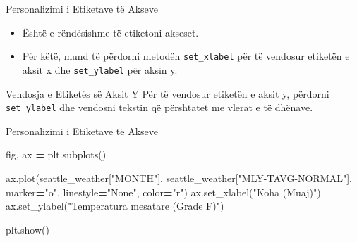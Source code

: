\documentclass[
  ignorenonframetext,
]{beamer}
\newenvironment{Shaded}{\begin{snugshade}}{\end{snugshade}}
\newcommand{\NormalTok}[1]{#1}
\newcommand{\OperatorTok}[1]{\textcolor[rgb]{0.81,0.36,0.00}{\textbf{#1}}}
\newcommand{\StringTok}[1]{\textcolor[rgb]{0.31,0.60,0.02}{#1}}
\begin{document}
\begin{frame}[fragile]{Personalizimi i Etiketave të Akseve}
\protect\hypertarget{personalizimi-i-etiketave-tuxeb-akseve}{}
\begin{itemize}
\item
  Është e rëndësishme të etiketoni akseset.
\item
  Për këtë, mund të përdorni metodën \texttt{set\_xlabel} për të
  vendosur etiketën e aksit x dhe \texttt{set\_ylabel} për aksin y.
\end{itemize}
\end{frame}

\begin{frame}[fragile]{Vendosja e Etiketës së Aksit Y}
\protect\hypertarget{vendosja-e-etiketuxebs-suxeb-aksit-y}{}
Për të vendosur etiketën e aksit y, përdorni \texttt{set\_ylabel} dhe
vendosni tekstin që përshtatet me vlerat e të dhënave.
\end{frame}

\begin{frame}[fragile]{Personalizimi i Etiketave të Akseve}
\protect\hypertarget{personalizimi-i-etiketave-tuxeb-akseve-1}{}

\begin{Shaded}
\begin{Highlighting}[]
\NormalTok{fig, ax }\OperatorTok{=}\NormalTok{ plt.subplots()}

\NormalTok{ax.plot(seattle\_weather[}\StringTok{"MONTH"}\NormalTok{], seattle\_weather[}\StringTok{"MLY{-}TAVG{-}NORMAL"}\NormalTok{],}
\NormalTok{marker}\OperatorTok{=}\StringTok{"o"}\NormalTok{, linestyle}\OperatorTok{=}\StringTok{"None"}\NormalTok{, color}\OperatorTok{=}\StringTok{"r"}\NormalTok{)}
\NormalTok{ax.set\_xlabel(}\StringTok{"Koha (Muaj)"}\NormalTok{)}
\NormalTok{ax.set\_ylabel(}\StringTok{"Temperatura mesatare (Grade F)"}\NormalTok{)}

\NormalTok{plt.show()}
\end{Highlighting}
\end{Shaded}
\end{frame}
\end{document}

